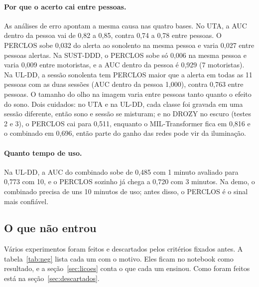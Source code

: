 \documentclass[11pt,a4paper]{article}
\begin{document}
\paragraph{Por que o acerto cai entre pessoas.} As análises de erro apontam a mesma causa nas quatro bases. No UTA, a AUC dentro da pessoa vai de 0,82 a 0,85, contra 0,74 a 0,78 entre pessoas. O PERCLOS sobe 0,032 do alerta ao sonolento na mesma pessoa e varia 0,027 entre pessoas alertas. Na SUST-DDD, o PERCLOS sobe só 0,006 na mesma pessoa e varia 0,009 entre motoristas, e a AUC dentro da pessoa é 0,929 (7 motoristas). Na UL-DD, a sessão sonolenta tem PERCLOS maior que a alerta em todas as 11 pessoas com as duas sessões (AUC dentro da pessoa 1,000), contra 0,763 entre pessoas. O tamanho do olho na imagem varia entre pessoas tanto quanto o efeito do sono. Dois cuidados: no UTA e na UL-DD, cada classe foi gravada em uma sessão diferente, então sono e sessão se misturam; e no DROZY no escuro (testes 2 e 3), o PERCLOS cai para 0,511, enquanto o MIL-Transformer fica em 0,816 e o combinado em 0,696, então parte do ganho das redes pode vir da iluminação.

\paragraph{Quanto tempo de uso.} Na UL-DD, a AUC do combinado sobe de 0,485 com 1 minuto avaliado para 0,773 com 10, e o PERCLOS sozinho já chega a 0,720 com 3 minutos. Na demo, o combinado precisa de uns 10 minutos de uso; antes disso, o PERCLOS é o sinal mais confiável.

\subsection{O que não entrou}
\label{sec:negativos}

Vários experimentos foram feitos e descartados pelos critérios fixados antes. A tabela~\ref{tab:neg} lista cada um com o motivo. Eles ficam no notebook como resultado, e a seção~\ref{sec:licoes} conta o que cada um ensinou. Como foram feitos está na seção~\ref{sec:descartados}.
\end{document}
